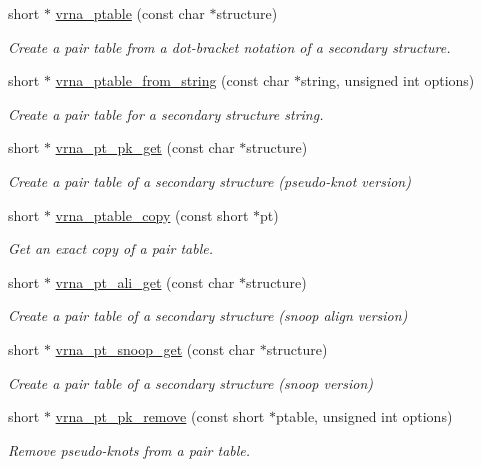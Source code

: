 \begin{DoxyCompactItemize}
\item 
short $\ast$ \mbox{\hyperlink{group__struct__utils__pair__table_gae829fb8bb7f694c12a9c0bbc34c77c60}{vrna\+\_\+ptable}} (const char $\ast$structure)
\begin{DoxyCompactList}\small\item\em Create a pair table from a dot-\/bracket notation of a secondary structure. \end{DoxyCompactList}\item 
short $\ast$ \mbox{\hyperlink{group__struct__utils__pair__table_gac76c9ef3de507748fb0416a59323362b}{vrna\+\_\+ptable\+\_\+from\+\_\+string}} (const char $\ast$string, unsigned int options)
\begin{DoxyCompactList}\small\item\em Create a pair table for a secondary structure string. \end{DoxyCompactList}\item 
short $\ast$ \mbox{\hyperlink{group__struct__utils__pair__table_gacca520048b24ec5a8978f4dafb4e4bf8}{vrna\+\_\+pt\+\_\+pk\+\_\+get}} (const char $\ast$structure)
\begin{DoxyCompactList}\small\item\em Create a pair table of a secondary structure (pseudo-\/knot version) \end{DoxyCompactList}\item 
short $\ast$ \mbox{\hyperlink{group__struct__utils__pair__table_ga2daefbbd6d9f8803731651882f54332d}{vrna\+\_\+ptable\+\_\+copy}} (const short $\ast$pt)
\begin{DoxyCompactList}\small\item\em Get an exact copy of a pair table. \end{DoxyCompactList}\item 
short $\ast$ \mbox{\hyperlink{group__struct__utils__pair__table_ga1ee4cdcda1f57d32dcb38032116d335d}{vrna\+\_\+pt\+\_\+ali\+\_\+get}} (const char $\ast$structure)
\begin{DoxyCompactList}\small\item\em Create a pair table of a secondary structure (snoop align version) \end{DoxyCompactList}\item 
short $\ast$ \mbox{\hyperlink{group__struct__utils__pair__table_gaef0f7e1a6c00c81a349973de53039dda}{vrna\+\_\+pt\+\_\+snoop\+\_\+get}} (const char $\ast$structure)
\begin{DoxyCompactList}\small\item\em Create a pair table of a secondary structure (snoop version) \end{DoxyCompactList}\item 
short $\ast$ \mbox{\hyperlink{group__struct__utils__pair__table_gae8f31c859b48f97b8af889e914e4d040}{vrna\+\_\+pt\+\_\+pk\+\_\+remove}} (const short $\ast$ptable, unsigned int options)
\begin{DoxyCompactList}\small\item\em Remove pseudo-\/knots from a pair table. \end{DoxyCompactList}\end{DoxyCompactItemize}


